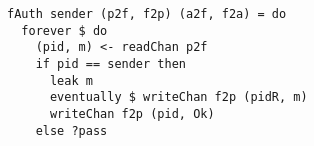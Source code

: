 \begin{lstlisting}
fAuth sender (p2f, f2p) (a2f, f2a) = do
  forever $ do
    (pid, m) <- readChan p2f
    if pid == sender then
      leak m
      eventually $ writeChan f2p (pidR, m)
      writeChan f2p (pid, Ok)
    else ?pass
\end{lstlisting}
